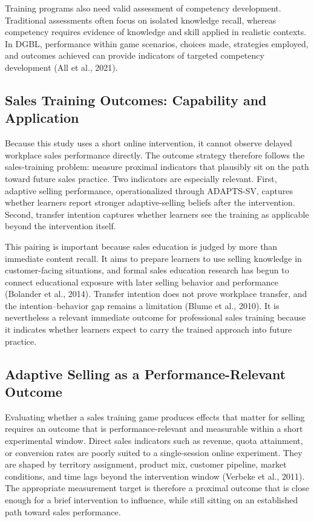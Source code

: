 \documentclass[12pt]{report}
\begin{document}
Training programs also need valid assessment of competency development. Traditional assessments often focus on isolated knowledge recall, whereas competency requires evidence of knowledge and skill applied in realistic contexts. In DGBL, performance within game scenarios, choices made, strategies employed, and outcomes achieved can provide indicators of targeted competency development (All et al., 2021).

\subsection{Sales Training Outcomes: Capability and Application}
Because this study uses a short online intervention, it cannot observe delayed workplace sales performance directly. The outcome strategy therefore follows the sales-training problem: measure proximal indicators that plausibly sit on the path toward future sales practice. Two indicators are especially relevant. First, adaptive selling performance, operationalized through ADAPTS-SV, captures whether learners report stronger adaptive-selling beliefs after the intervention. Second, transfer intention captures whether learners see the training as applicable beyond the intervention itself.

This pairing is important because sales education is judged by more than immediate content recall. It aims to prepare learners to use selling knowledge in customer-facing situations, and formal sales education research has begun to connect educational exposure with later selling behavior and performance (Bolander et al., 2014). Transfer intention does not prove workplace transfer, and the intention--behavior gap remains a limitation (Blume et al., 2010). It is nevertheless a relevant immediate outcome for professional sales training because it indicates whether learners expect to carry the trained approach into future practice.

\subsection{Adaptive Selling as a Performance-Relevant Outcome}
Evaluating whether a sales training game produces effects that matter for selling requires an outcome that is performance-relevant and measurable within a short experimental window. Direct sales indicators such as revenue, quota attainment, or conversion rates are poorly suited to a single-session online experiment. They are shaped by territory assignment, product mix, customer pipeline, market conditions, and time lags beyond the intervention window (Verbeke et al., 2011). The appropriate measurement target is therefore a proximal outcome that is close enough for a brief intervention to influence, while still sitting on an established path toward sales performance.
\end{document}
